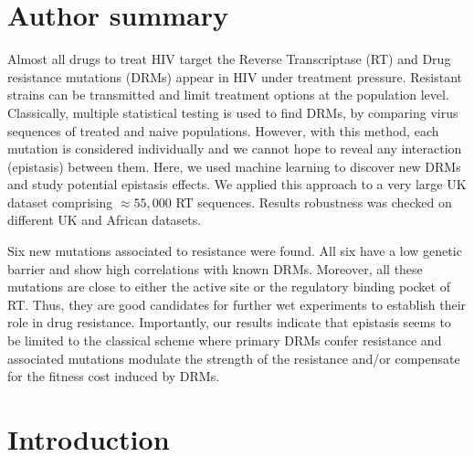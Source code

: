 \documentclass[
  11pt,
  twoside,
  BCOR=10mm,
  listof=totoc]{scrbook}
\begin{document}
\hypertarget{author-summary}{%
\section*{Author summary}\label{author-summary}}

Almost all drugs to treat HIV target the Reverse Transcriptase (RT) and
Drug resistance mutations (DRMs) appear in HIV under treatment pressure.
Resistant strains can be transmitted and limit treatment options at the
population level. Classically, multiple statistical testing is used to
find DRMs, by comparing virus sequences of treated and naive
populations. However, with this method, each mutation is considered
individually and we cannot hope to reveal any interaction (epistasis)
between them. Here, we used machine learning to discover new DRMs and
study potential epistasis effects. We applied this approach to a very
large UK dataset comprising \(\approx 55,000\) RT sequences. Results
robustness was checked on different UK and African datasets.

Six new mutations associated to resistance were found. All six have a
low genetic barrier and show high correlations with known DRMs.
Moreover, all these mutations are close to either the active site or the
regulatory binding pocket of RT. Thus, they are good candidates for
further wet experiments to establish their role in drug resistance.
Importantly, our results indicate that epistasis seems to be limited to
the classical scheme where primary DRMs confer resistance and associated
mutations modulate the strength of the resistance and/or compensate for
the fitness cost induced by DRMs.

\hypertarget{hiv-introduction}{%
\section{Introduction}\label{hiv-introduction}}
\end{document}
